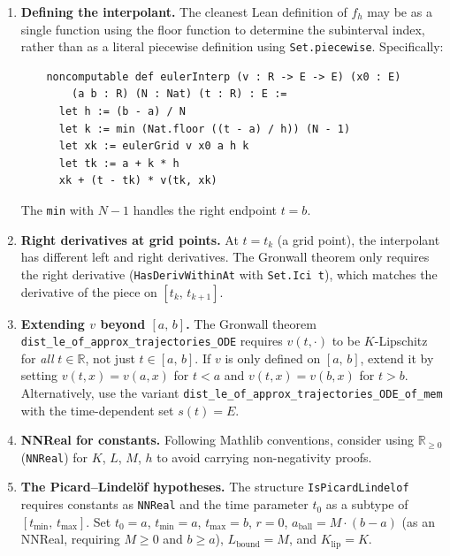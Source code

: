 \documentclass[11pt,a4paper]{article}
\theoremstyle{definition}
\newcommand{\R}{\mathbb{R}}
\newcommand{\Icc}[2]{[#1,\, #2]}
\begin{document}
\begin{enumerate}
  \item \textbf{Defining the interpolant.}
    The cleanest Lean definition of $f_h$ may be as a single function
    using the floor function to determine the subinterval index,
    rather than as a literal piecewise definition using
    \texttt{Set.piecewise}. Specifically:
    \begin{verbatim}
    noncomputable def eulerInterp (v : R -> E -> E) (x0 : E)
        (a b : R) (N : Nat) (t : R) : E :=
      let h := (b - a) / N
      let k := min (Nat.floor ((t - a) / h)) (N - 1)
      let xk := eulerGrid v x0 a h k
      let tk := a + k * h
      xk + (t - tk) * v(tk, xk)
    \end{verbatim}
    The \texttt{min} with $N-1$ handles the right endpoint $t = b$.

  \item \textbf{Right derivatives at grid points.}
    At $t = t_k$ (a grid point), the interpolant has different
    left and right derivatives. The Gronwall theorem only requires
    the right derivative (\texttt{HasDerivWithinAt} with
    \texttt{Set.Ici t}), which matches the derivative of the
    piece on $\Icc{t_k}{t_{k+1}}$.

  \item \textbf{Extending $v$ beyond $\Icc{a}{b}$.}
    The Gronwall theorem \texttt{dist\_le\_of\_approx\_trajectories\_ODE}
    requires $v(t, \cdot)$ to be $K$-Lipschitz for \emph{all}
    $t \in \R$, not just $t \in \Icc{a}{b}$. If $v$ is only
    defined on $\Icc{a}{b}$, extend it by setting
    $v(t, x) = v(a, x)$ for $t < a$ and $v(t, x) = v(b, x)$ for
    $t > b$. Alternatively, use the variant
    \texttt{dist\_le\_of\_approx\_trajectories\_ODE\_of\_mem}
    with the time-dependent set $s(t) = E$.

  \item \textbf{NNReal for constants.}
    Following Mathlib conventions, consider using $\R_{\ge 0}$
    (\texttt{NNReal}) for $K$, $L$, $M$, $h$ to avoid carrying
    non-negativity proofs.

  \item \textbf{The Picard--Lindel\"of hypotheses.}
    The structure \texttt{IsPicardLindelof} requires constants
    as \texttt{NNReal} and the time parameter $t_0$ as a subtype
    of $\Icc{t_{\min}}{t_{\max}}$. Set $t_0 = a$,
    $t_{\min} = a$, $t_{\max} = b$, $r = 0$,
    $a_{\mathrm{ball}} = M \cdot (b - a)$ (as an NNReal, requiring
    $M \ge 0$ and $b \ge a$), $L_{\mathrm{bound}} = M$, and
    $K_{\mathrm{lip}} = K$.
\end{enumerate}
\end{document}

